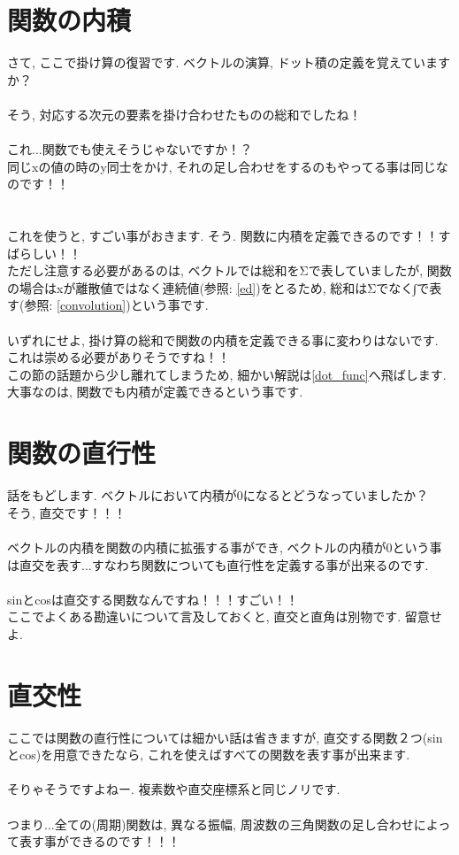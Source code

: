\documentclass[11pt,a4paper]{jreport}
\begin{document}
\section{関数の内積　\label{dot}}
さて, ここで掛け算の復習です. ベクトルの演算, ドット積の定義を覚えていますか？\\
\\
そう, 対応する次元の要素を掛け合わせたものの総和でしたね！\\
\\
これ...関数でも使えそうじゃないですか！？\\
同じxの値の時のy同士をかけ, それの足し合わせをするのもやってる事は同じなのです！！\\
\\
\\
これを使うと, すごい事がおきます. そう. 関数に内積を定義できるのです！！すばらしい！！\\
ただし注意する必要があるのは, ベクトルでは総和をΣで表していましたが, 関数の場合はxが離散値ではなく連続値(参照: \ref{ed})をとるため, 総和はΣでなく∫で表す(参照: \ref{convolution})という事です.\\
\\
いずれにせよ, 掛け算の総和で関数の内積を定義できる事に変わりはないです. これは崇める必要がありそうですね！！\\
この節の話題から少し離れてしまうため, 細かい解説は\ref{dot_func}へ飛ばします. 大事なのは, 関数でも内積が定義できるという事です.


\section{関数の直行性}
話をもどします. ベクトルにおいて内積が0になるとどうなっていましたか？\\
そう, 直交です！！！\\
\\
ベクトルの内積を関数の内積に拡張する事ができ, ベクトルの内積が0という事は直交を表す...すなわち関数についても直行性を定義する事が出来るのです.\\
\\
sinとcosは直交する関数なんですね！！！すごい！！\\
ここでよくある勘違いについて言及しておくと, 直交と直角は別物です. 留意せよ.
\section{直交性}
ここでは関数の直行性については細かい話は省きますが, 直交する関数２つ(sinとcos)を用意できたなら, これを使えばすべての関数を表す事が出来ます.\\
\\
そりゃそうですよねー. 複素数や直交座標系と同じノリです.\\
\\
つまり...全ての(周期)関数は, 異なる振幅, 周波数の三角関数の足し合わせによって表す事ができるのです！！！\\
\end{document}
